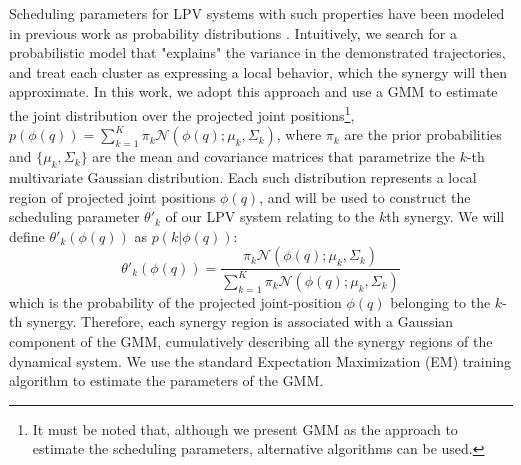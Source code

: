 \documentclass[letterpaper, 10 pt, conference,fleqn]{ieeeconf}
\begin{document}
Scheduling parameters for LPV systems with such properties have been modeled in previous work as probability distributions \cite{7439839, Salehian-RSS-16}. Intuitively, we search for a probabilistic model that "explains" the variance in the demonstrated trajectories, and treat each cluster as expressing a local behavior, which the synergy will then approximate. In this work, we adopt this approach and use a GMM to estimate the joint distribution over the projected joint positions\footnote{It must be noted that, although we present GMM as the approach to estimate the scheduling parameters, alternative algorithms can be used.}, $p(\phi(q)) = \sum_{k=1}^K\pi_k\mathcal{N}(\phi(q);\mu_k,\Sigma_k)$, where $\pi_k$ are the prior probabilities and $\{\mu_k,\Sigma_k\}$ are the mean and covariance matrices that parametrize the $k$-th multivariate Gaussian distribution. Each such distribution represents a local region of projected joint positions $\phi(q)$, and will be used to construct the scheduling parameter $\theta'_k$ of our LPV system relating to the $k$th synergy. We will define $\theta'_k(\phi(q))$ as $p(k|\phi(q))$:
\begin{equation}
\label{eq:theta}
\theta'_k(\phi(q))= \frac{\pi_k\mathcal{N} (\phi(q); \mu_k, \Sigma_k)}{\sum_{k=1}^K \pi_k\mathcal{N} (\phi(q); \mu_k, \Sigma_k)}
\end{equation}
which is the probability of the projected joint-position $\phi(q)$ belonging to the $k$-th synergy. Therefore, each synergy region is associated with a Gaussian component of the GMM, cumulatively describing all the synergy regions of the dynamical system. We use the standard Expectation Maximization (EM) training algorithm to estimate the parameters of the GMM.
\end{document}
